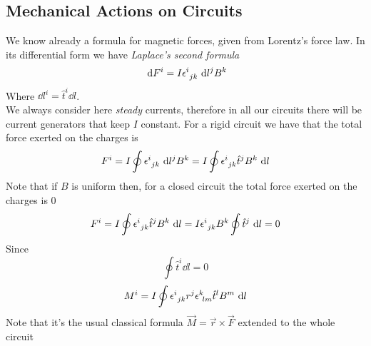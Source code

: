 \documentclass[../electromagnetism]{subfiles}
\begin{document}
\subsection{Mechanical Actions on Circuits}
We know already a formula for magnetic forces, given from Lorentz's force law. In its differential form we have \textit{Laplace's second formula}
\begin{equation}
	\ \mathrm{d} F^i=I\epsilon^{i}_{\ jk}\ \mathrm{d} l^jB^k
	\label{eq:laplace2}
\end{equation}
Where $\dd l^i=\hat{t}^i\dd l$.\\
We always consider here \textit{steady} currents, therefore in all our circuits there will be current generators that keep $I$ constant. For a rigid circuit we have that the total force exerted on the charges is
\begin{equation}
	F^i=I\oint\epsilon^{i}_{\ jk}\ \mathrm{d} l^jB^k=I\oint\epsilon^{i}_{\ jk}\hat{t}^jB^k\ \mathrm{d} l
	\label{eq:forcecircuit}
\end{equation}
Note that if $B$ is uniform then, for a closed circuit the total force exerted on the charges is 0
\begin{equation*}
	F^i=I\oint\epsilon^{i}_{\ jk}\hat{t}^jB^k\ \mathrm{d} l=I\epsilon^{i}_{\ jk}B^k\oint\hat{t}^j\ \mathrm{d} l=0
\end{equation*}
Since
\begin{equation*}
	\oint\hat{t}^i\dd l=0
\end{equation*}
\begin{equation}
	M^i=I\oint\epsilon^{i}_{\ jk}r^j\epsilon^{k}_{\ lm}\hat{t}^lB^m\ \mathrm{d} l
	\label{eq:magmomentum}
\end{equation}
Note that it's the usual classical formula $\vec{M}=\vec{r}\times\vec{F}$ extended to the whole circuit
\end{document}
